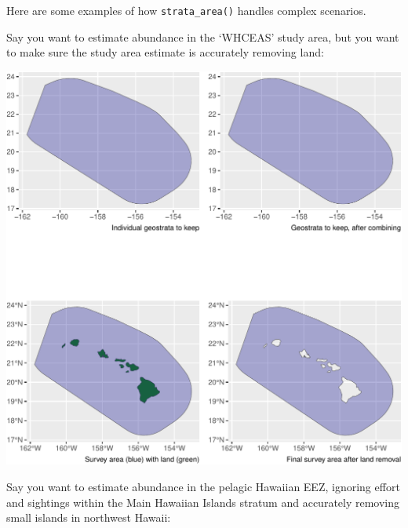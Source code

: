 \documentclass[
]{book}
\newenvironment{Shaded}{\begin{snugshade}}{\end{snugshade}}
\newcommand{\AttributeTok}[1]{\textcolor[rgb]{0.77,0.63,0.00}{#1}}
\newcommand{\ConstantTok}[1]{\textcolor[rgb]{0.00,0.00,0.00}{#1}}
\newcommand{\FunctionTok}[1]{\textcolor[rgb]{0.00,0.00,0.00}{#1}}
\newcommand{\NormalTok}[1]{#1}
\newcommand{\OtherTok}[1]{\textcolor[rgb]{0.56,0.35,0.01}{#1}}
\newcommand{\SpecialCharTok}[1]{\textcolor[rgb]{0.00,0.00,0.00}{#1}}
\newcommand{\StringTok}[1]{\textcolor[rgb]{0.31,0.60,0.02}{#1}}
\begin{document}
Here are some examples of how \texttt{strata\_area()} handles complex scenarios.

Say you want to estimate abundance in the `WHCEAS' study area, but you want to make sure the study area estimate is accurately removing land:

\begin{Shaded}
\end{Shaded}

\includegraphics{figures/unnamed-chunk-250-1.pdf}

Say you want to estimate abundance in the pelagic Hawaiian EEZ, ignoring effort and sightings within the Main Hawaiian Islands stratum and accurately removing small islands in northwest Hawaii:

\begin{Shaded}
\end{Shaded}
\end{document}

